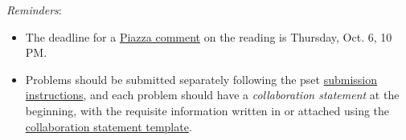 \documentclass[handout]{mcs}
\begin{document}
\renewcommand{\reading}
{
\emph{For this pset}: Section~\bref{state_machine_sec}{ on State Machines}, 
Chapter~\bref{recursive_data_chap}{ on Recursive Data}, and 
Sections~\bref{divisibility_sec}{ --}~\bref{fundamental_theorem_sec}{ on Number 
Theory.}

\emph{For lecture, Friday, Oct. 7}:
Sections~\bref{Turing_sec}{ --}~\bref{mod_prime_sec}{ on Modular Arithmetic.}
}



  \emph{Reminders}:
\begin{itemize}
\item The deadline for a
  \href{http://courses.csail.mit.edu/6.042/fall11/courseinfo#comments}{Piazza
    comment} on the reading is Thursday, Oct. 6, 10 PM.
\item Problems should be submitted separately following the pset
  \href{http://courses.csail.mit.edu/6.042/fall11/submission}{submission
    instructions}, and each problem should have a \emph{collaboration
    statement} at the beginning, with the requisite information
  written in or attached using the
  \href{http://courses.csail.mit.edu/6.042/fall11/submission_template.pdf}{collaboration
    statement template}.

 \end{itemize}






\iffalse
NOT THIS WEEK


\pinput{PS_calculating_inverses}

\large\textbf{Repo: PS\_congruent\_modulo\_1000}
\pinput{PS_congruent_modulo_1000}

\large\textbf{Repo: PS\_RSA\_correctness}
\pinput{PS_RSA_correctness}
\fi






\end{document}
